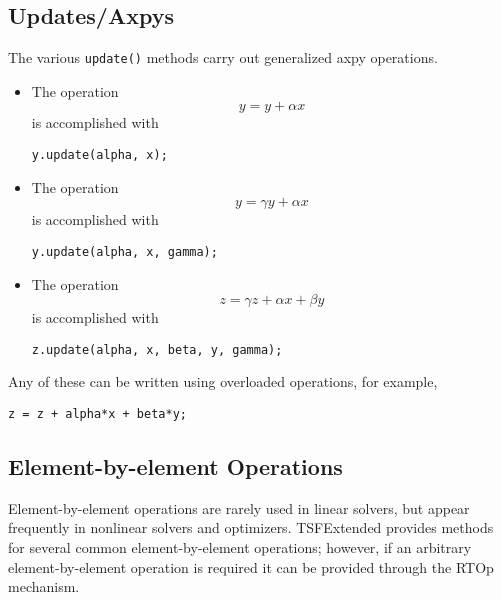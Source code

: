 \documentclass[12pt,relax]{SANDreport}
\begin{document}
\subsection{Updates/Axpys}

The various \verb+update()+ methods carry out generalized axpy operations.
\begin{itemize}
\item The operation
\begin{equation}
y = y + \alpha x
\end{equation}
is accomplished with
\begin{verbatim}
y.update(alpha, x);
\end{verbatim}
\item The operation
\begin{equation}
y = \gamma y + \alpha x
\end{equation}
is accomplished with
\begin{verbatim}
y.update(alpha, x, gamma);
\end{verbatim}
\item The operation
\begin{equation}
z = \gamma z + \alpha x + \beta y
\end{equation}
is accomplished with
\begin{verbatim}
z.update(alpha, x, beta, y, gamma);
\end{verbatim}
\end{itemize}
Any of these can be written using overloaded operations, for example,
\begin{verbatim}
z = z + alpha*x + beta*y;
\end{verbatim}

\subsection{Element-by-element Operations}

Element-by-element operations are rarely used in linear solvers, but
appear frequently in nonlinear solvers and optimizers. TSFExtended provides
methods for several common element-by-element operations; however, if an
arbitrary element-by-element operation is required it can be provided
through the RTOp mechanism.
\end{document}
